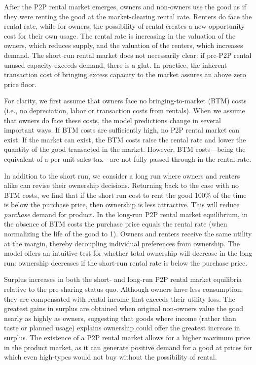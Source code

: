 \documentclass[11pt]{article}
\begin{document}
After the P2P rental market emerges, owners and non-owners use the good as if they were renting the good at the market-clearing rental rate. 
Renters do face the rental rate, while for owners, the possibility of rental creates a new opportunity cost for their own usage. 
The rental rate is increasing in the valuation of the owners, which reduces supply, and the valuation of the renters, which increases demand. 
The short-run rental market does not necessarily clear: if pre-P2P rental unused capacity exceeds demand, there is a glut. 
In practice, the inherent transaction cost of bringing excess capacity to the market assures an above zero price floor.

For clarity, we first assume that owners face no bringing-to-market (BTM) costs (i.e., no depreciation, labor or transaction costs from rentals).
When we assume that owners do face these costs, the model predictions change in several important ways.
If BTM costs are sufficiently high, no P2P rental market can exist.
If the market can exist, the BTM costs raise the rental rate and lower the quantity of the good transacted in the market.
However, BTM costs---being the equivalent of a per-unit sales tax---are not fully passed through in the rental rate.

In addition to the short run, we consider a long run where owners and renters alike can revise their ownership decisions.
Returning back to the case with no BTM costs, we find that if the short run cost to rent the good 100\% of the time is below the purchase price, then ownership is less attractive.
This will reduce \emph{purchase} demand for product.
In the long-run P2P rental market equilibrium, in the absence of BTM costs the purchase price equals the rental rate (when normalizing the life of the good to 1).
Owners and renters receive the same utility at the margin, thereby decoupling individual preferences from ownership. 
The model offers an intuitive test for whether total ownership will decrease in the long run:
ownership decreases if the short-run rental rate is below the purchase price. 

Surplus increases in both the short- and long-run P2P rental market equilibria relative to the pre-sharing status quo.
Although owners have less consumption, they are compensated with rental income that exceeds their utility loss. 
The greatest gains in surplus are obtained when original non-owners value the good nearly as highly as owners, suggesting that goods where income (rather than taste or planned usage) explains ownership could offer the greatest increase in surplus. 
The existence of a P2P rental market allows for a higher maximum price in the product market, as it can generate positive demand for a good at prices for which even high-types would not buy without the possibility of rental. 
\end{document}
